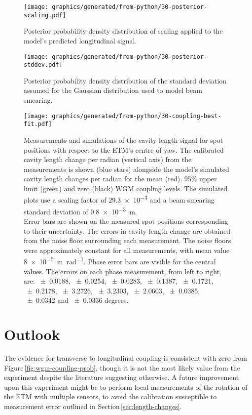 \begin{figure}
  \centering
  \texttt{[image: graphics/generated/from-python/30-posterior-scaling.pdf]}
  \caption{\label{fig:posterior-scaling}Posterior probability density distribution of scaling applied to the model's predicted longitudinal signal.}
\end{figure}

\begin{figure}
  \texttt{[image: graphics/generated/from-python/30-posterior-stddev.pdf]}
  \caption{\label{fig:posterior-stddev}Posterior probability density distribution of the standard deviation assumed for the Gaussian distribution used to model beam smearing.}
\end{figure}

\begin{figure}[H]
  \centering
  \texttt{[image: graphics/generated/from-python/30-coupling-best-fit.pdf]}
  \caption{\label{fig:wgm-coupling}Measurements and simulations of the cavity length signal for spot positions with respect to the \gls{ETM}'s centre of yaw. The calibrated cavity length change per radian (vertical axis) from the measurements is shown (blue stars) alongside the model's simulated cavity length changes per radian for the mean (red), 95\% upper limit (green) and zero (black) \gls{WGM} coupling levels. The simulated plots use a scaling factor of \num{29.3e-3} and a beam smearing standard deviation of \SI{0.8e-3}{\meter}.
  \bigskip
  \\ Error bars are shown on the measured spot positions corresponding to their uncertainty. The errors in cavity length change are obtained from the noise floor surrounding each measurement. The noise floors were approximately constant for all measurements, with mean value \SI{8e-5}{\meter \per \radian}. Phase error bars are visible for the central values. The errors on each phase measurement, from left to right, are: \num{+-0.0188}, \num{+-0.0254}, \num{+-0.0283}, \num{+-0.1387}, \num{+-0.1721}, \num{+-0.2178}, \num{+-3.2726}, \num{+-3.2303}, \num{+-2.0603}, \num{+-0.0385}, \num{+-0.0342} and \num{+-0.0336} degrees.}
\end{figure}

\section{Outlook}
The evidence for transverse to longitudinal coupling is consistent with zero from Figure\,\ref{fig:wgm-coupling-prob}, though it is not the most likely value from the experiment despite the literature suggesting otherwise. A future improvement upon this experiment might be to perform local measurements of the rotation of the \gls{ETM} with multiple sensors, to avoid the calibration susceptible to measurement error outlined in Section\,\ref{sec:length-changes}.

